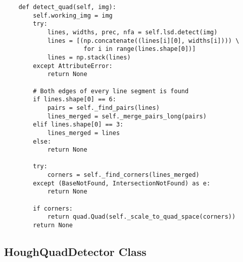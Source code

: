 \begin{verbatim}
    def detect_quad(self, img):
        self.working_img = img
        try:
            lines, widths, prec, nfa = self.lsd.detect(img)
            lines = [(np.concatenate((lines[i][0], widths[i]))) \
                      for i in range(lines.shape[0])]
            lines = np.stack(lines)
        except AttributeError:
            return None
        
        # Both edges of every line segment is found
        if lines.shape[0] == 6:
            pairs = self._find_pairs(lines)
            lines_merged = self._merge_pairs_long(pairs)
        elif lines.shape[0] == 3:
            lines_merged = lines
        else:
            return None
        
        try:
            corners = self._find_corners(lines_merged)
        except (BaseNotFound, IntersectionNotFound) as e:
            return None
        
        if corners:
            return quad.Quad(self._scale_to_quad_space(corners))
        return None
\end{verbatim}

\subsection{HoughQuadDetector Class}

